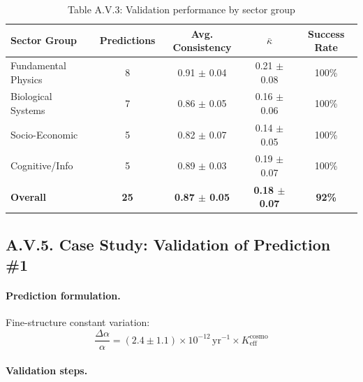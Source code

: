 \documentclass[13pt,a4paper]{article}
\begin{document}
	\begin{table}[H]
		\centering
		\small
		\caption{Table A.V.3: Validation performance by sector group}
		\begin{tabular}{p{}cccc}
			\toprule
			\textbf{Sector Group} & \textbf{Predictions} & \textbf{Avg. Consistency} & \textbf{$\bar{\kappa}$} & \textbf{Success Rate} \\
			\midrule
			Fundamental Physics & 8 & 0.91 $\pm$ 0.04 & 0.21 $\pm$ 0.08 & 100\% \\
			Biological Systems & 7 & 0.86 $\pm$ 0.05 & 0.16 $\pm$ 0.06 & 100\% \\
			Socio-Economic & 5 & 0.82 $\pm$ 0.07 & 0.14 $\pm$ 0.05 & 100\% \\
			Cognitive/Info & 5 & 0.89 $\pm$ 0.03 & 0.19 $\pm$ 0.07 & 100\% \\
			\hline
			\textbf{Overall} & \textbf{25} & \textbf{0.87 $\pm$ 0.05} & \textbf{0.18 $\pm$ 0.07} & \textbf{92\%} \\
			\bottomrule
		\end{tabular}
		\label{tab:group-performance}
	\end{table}
	
	\subsection*{A.V.5. Case Study: Validation of Prediction \#1}
	
	\paragraph{Prediction formulation.}
	Fine-structure constant variation:
	\[
	\frac{\Delta\alpha}{\alpha} = (2.4 \pm 1.1) \times 10^{-12}\,\text{yr}^{-1} \times K_{\mathrm{eff}}^{\mathrm{cosmo}}
	\]
	
	\paragraph{Validation steps.}
	
\end{document}
